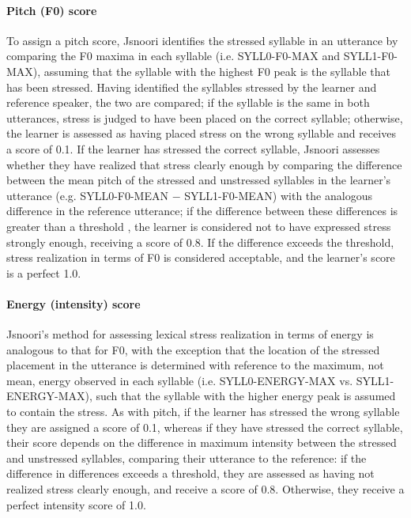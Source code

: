 	
	\paragraph{Pitch (F0) score}
	
	To assign a pitch score, Jsnoori identifies the stressed syllable in an utterance  by comparing the F0 maxima in each syllable (i.e. SYLL0-F0-MAX and SYLL1-F0-MAX), assuming that the syllable with the highest F0 peak is the syllable that has been stressed. 
	 Having identified the syllables stressed by the learner and reference speaker, the two are compared;
	if the syllable is the same in both utterances, stress is judged to have been placed on the correct syllable; otherwise, the learner is assessed as having placed stress on the wrong syllable and receives a score of 0.1. If the learner has stressed the correct syllable, Jsnoori assesses whether they have realized that stress clearly enough by comparing the difference between the mean pitch of the stressed and unstressed syllables in the learner's utterance (e.g. SYLL0-F0-MEAN $-$ SYLL1-F0-MEAN) with the analogous difference in the reference utterance; if the difference between these differences is greater than a threshold , the learner is considered not to have expressed stress strongly enough, receiving a score of 0.8. If the difference exceeds the threshold, stress realization in terms of F0 is considered acceptable, and the learner's score is a perfect 1.0.
	
	
	\paragraph{Energy (intensity) score}
	
	Jsnoori's method for assessing lexical stress realization in terms of energy is analogous to that for F0, with the exception that the location of the stressed placement in the utterance is determined with reference to the maximum, not mean, energy observed in each syllable (i.e. SYLL0-ENERGY-MAX vs. SYLL1-ENERGY-MAX), such that the syllable with the higher energy peak is assumed to contain the stress.  
	As with pitch, if the learner has stressed the wrong syllable they are assigned a score of 0.1, whereas if they have stressed the correct syllable, their score depends on the difference in maximum intensity between the stressed and unstressed syllables, comparing their utterance to the reference: if the difference in differences exceeds a threshold, they are assessed as having not realized stress clearly enough, and receive a score of 0.8. Otherwise, they receive a perfect intensity score of 1.0.



